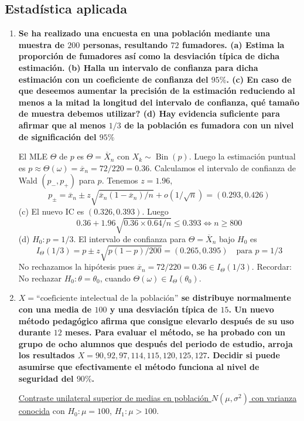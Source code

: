   \subsection{Estadística aplicada}
  \begin{enumerate}
  \item \textbf{Se ha realizado una encuesta en una población mediante una muestra de $200$ personas, resultando $72$ fumadores. (a) Estima la proporción de fumadores así como la desviación típica de dicha estimación. (b) Halla un intervalo de confianza para dicha estimación con un coeficiente de confianza del $95\%$. (c) En caso de que deseemos aumentar la precisión de la estimación reduciendo al menos a la mitad la longitud del intervalo de confianza, qué tamaño de muestra debemos utilizar? (d) Hay evidencia suficiente para afirmar que al menos $1/3$ de la población es fumadora con un nivel de significación del $95\%$}

  El MLE $\Theta$ de $p$ es $\Theta = \overline{X}_n$ con $X_k \sim \operatorname{Bin}(p)$. Luego la estimación puntual es $p \approx \Theta(\omega) = \overline{x}_n = 72/220 = 0.36$. Calculamos el intervalo de confianza de Wald $(p_-, p_+)$ para $p$. Tenemos $z = 1.96$,
  \[
    p_\pm = \overline{x}_n \pm z\sqrt{\overline{x}_n(1 - \overline{x}_n)/n} + o(1/\sqrt{n}) = (0.293, 0.426)
  \]
  (c) El nuevo IC es $(0.326, 0.393)$. Luego
  \[
    0.36 + 1.96\sqrt{0.36 \times 0.64/n} \leq 0.393 \iff n \geq 800
  \]
  (d) $H_0 : p = 1/3$. El intervalo de confianza para $\Theta = \overline{X}_n$ bajo $H_0$ es
  \[
    I_\Theta(1/3) = p \pm z\sqrt{p(1 - p)/200} = (0.265, 0.395) \quad \text{para } p = 1/3
  \]
  No rechazamos la hipótesis pues $\overline{x}_n = 72/220 = 0.36 \in I_\Theta(1/3)$.
  Recordar: No rechazar $H_0 : \theta = \theta_0$, cuando $\Theta(\omega) \in I_\Theta(\theta_0)$.

  \item \textbf{$X = \text{``coeficiente intelectual de la población''}$ se distribuye normalmente con una media de $100$ y una desviación típica de $15$. Un nuevo método pedagógico afirma que consigue elevarlo después de su uso durante $12$ meses. Para evaluar el método, se ha probado con un grupo de ocho alumnos que después del periodo de estudio, arroja los resultados $X = 90, 92, 97, 114, 115, 120, 125, 127$. Decidir si puede asumirse que efectivamente el método funciona al nivel de seguridad del $90\%$.}

  \noindent\underline{Contraste unilateral superior de medias en población $N(\mu, \sigma^2)$ con varianza conocida} con $H_0 : \mu = 100$, $H_1 : \mu > 100$.


\end{enumerate}

